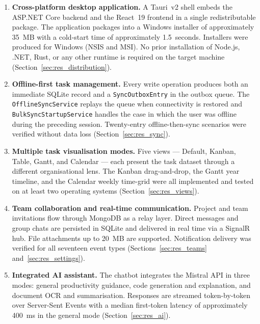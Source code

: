 \begin{enumerate}

  \item \textbf{Cross-platform desktop application.}
        A Tauri~v2 shell embeds the ASP.NET Core backend and the React~19 frontend
        in a single redistributable package.
        The application packages into a Windows installer of approximately
        35~MB with a cold-start time of approximately 1.5~seconds.
        Installers were produced for Windows (NSIS and MSI).
        No prior installation of Node.js, .NET, Rust, or any other runtime is required
        on the target machine (Section~\ref{sec:res_distribution}).

  \item \textbf{Offline-first task management.}
        Every write operation produces both an immediate SQLite record and a
        \texttt{SyncOutboxEntry} in the outbox queue.
        The \texttt{OfflineSyncService} replays the queue when connectivity is restored
        and \texttt{BulkSyncStartupService} handles the case in which the user was offline
        during the preceding session.
        Twenty-entry offline-then-sync scenarios were verified without data loss
        (Section~\ref{sec:res_sync}).

  \item \textbf{Multiple task visualisation modes.}
        Five views --- Default, Kanban, Table, Gantt, and Calendar --- each present the
        task dataset through a different organisational lens.
        The Kanban drag-and-drop, the Gantt year timeline, and the Calendar weekly
        time-grid were all implemented and tested on at least two operating systems
        (Section~\ref{sec:res_views}).

  \item \textbf{Team collaboration and real-time communication.}
        Project and team invitations flow through MongoDB as a relay layer.
        Direct messages and group chats are persisted in SQLite and delivered in real time
        via a SignalR hub.
        File attachments up to 20~MB are supported.
        Notification delivery was verified for all seventeen event types
        (Sections~\ref{sec:res_teams} and~\ref{sec:res_settings}).

  \item \textbf{Integrated AI assistant.}
        The chatbot integrates the Mistral API in three modes: general productivity
        guidance, code generation and explanation, and document OCR and summarisation.
        Responses are streamed token-by-token over Server-Sent Events with a median
        first-token latency of approximately 400~ms in the general mode
        (Section~\ref{sec:res_ai}).


\end{enumerate}
